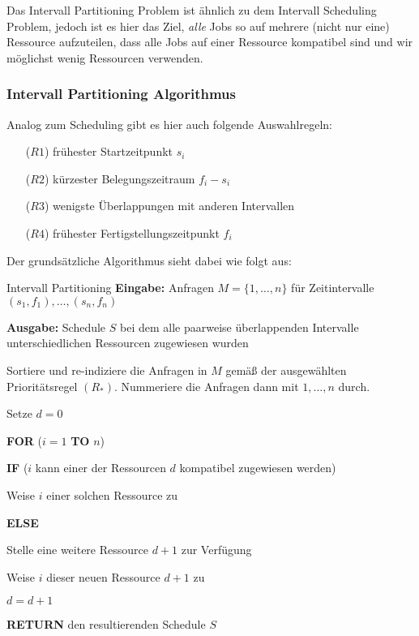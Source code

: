 \documentclass{panikzettel}
\newcommand\tab[1][1cm]{\hspace*{#1}}
\begin{document}
{Das Intervall Partitioning Problem ist ähnlich zu dem Intervall Scheduling Problem, jedoch ist es hier das Ziel, \textit{alle} Jobs so auf mehrere (nicht nur eine) Ressource aufzuteilen, dass alle Jobs auf einer Ressource kompatibel sind und wir möglichst wenig Ressourcen verwenden. 

\subsubsection{Intervall Partitioning Algorithmus}

Analog zum Scheduling gibt es hier auch folgende Auswahlregeln:

\begin{itemize}
	\item[($R1$)] frühester Startzeitpunkt $s_i$
	\item[($R2$)] kürzester Belegungszeitraum $f_i - s_i$
	\item[($R3$)] wenigste Überlappungen mit anderen Intervallen
	\item[($R4$)] frühester Fertigstellungszeitpunkt $f_i$
\end{itemize}

Der grundsätzliche Algorithmus sieht dabei wie folgt aus:

\begin{algo}{Intervall Partitioning}
	\textbf{Eingabe:} Anfragen $M= \{1, \dots , n\}$ für Zeitintervalle $(s_1,f_1), \dots,(s_n,f_n)$
	
	\textbf{Ausgabe:} Schedule $S$ bei dem alle paarweise überlappenden Intervalle unterschiedlichen Ressourcen zugewiesen wurden
	\tcblower
	
	Sortiere und re-indiziere die Anfragen in $M$ gemäß der ausgewählten Prioritätsregel $(R_*)$. Nummeriere die Anfragen dann mit $1,\dots, n$ durch.
	
	Setze $d=0$
	
	\textbf{FOR} ($i = 1$ \textbf{TO} $n$)
	
	\tab \textbf{IF} ($i$ kann einer der Ressourcen $d$ kompatibel zugewiesen werden)
	
	\tab\tab Weise $i$ einer solchen Ressource zu
	
	\tab \textbf{ELSE}
	
	\tab\tab Stelle eine weitere Ressource $d+1$ zur Verfügung
	
	\tab\tab Weise $i$ dieser neuen Ressource $d+1$ zu
	
	\tab\tab $d= d+1$

	
	\textbf{RETURN} den resultierenden Schedule $S$
\end{algo}

}
\end{document}
